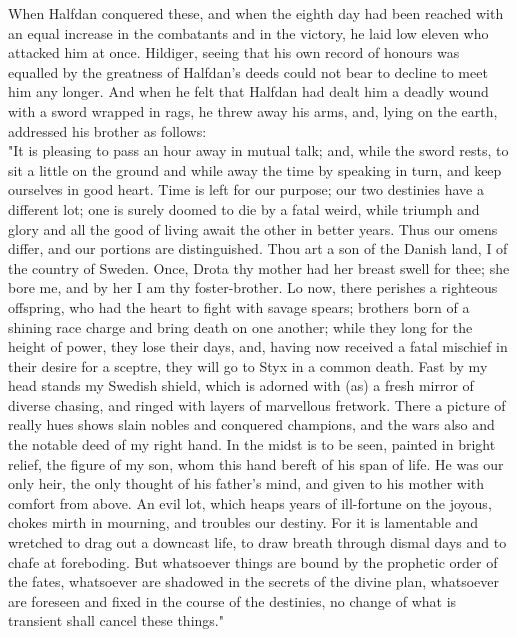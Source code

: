\documentclass[10pt,a4paper]{report}
\begin{document}
When Halfdan conquered these, and when the eighth day had been reached with an equal increase in the combatants and in the victory, he laid low eleven who attacked him at once. Hildiger, seeing that his own record of honours was equalled by the greatness of Halfdan's deeds could not bear to decline to meet him any longer. And when he felt that Halfdan had dealt him a deadly wound with a sword wrapped in rags, he threw away his arms, and, lying on the earth, addressed his brother as follows:\\

"It is pleasing to pass an hour away in mutual talk; and, while the sword rests, to sit a little on the ground and while away the time by speaking in turn, and keep ourselves in good heart. Time is left for our purpose; our two destinies have a different lot; one is surely doomed to die by a fatal weird, while triumph and glory and all the good of living await the other in better years. Thus our omens differ, and our portions are distinguished. Thou art a son of the Danish land, I of the country of Sweden. Once, Drota thy mother had her breast swell for thee; she bore me, and by her I am thy foster-brother. Lo now, there perishes a righteous offspring, who had the heart to fight with savage spears; brothers born of a shining race charge and bring death on one another; while they long for the height of power, they lose their days, and, having now received a fatal mischief in their desire for a sceptre, they will go to Styx in a common death. Fast by my head stands my Swedish shield, which is adorned with (as) a fresh mirror of diverse chasing, and ringed with layers of marvellous fretwork. There a picture of really hues shows slain nobles and conquered champions, and the wars also and the notable deed of my right hand. In the midst is to be seen, painted in bright relief, the figure of my son, whom this hand bereft of his span of life. He was our only heir, the only thought of his father's mind, and given to his mother with comfort from above. An evil lot, which heaps years of ill-fortune on the joyous, chokes mirth in mourning, and troubles our destiny. For it is lamentable and wretched to drag out a downcast life, to draw breath through dismal days and to chafe at foreboding. But whatsoever things are bound by the prophetic order of the fates, whatsoever are shadowed in the secrets of the divine plan, whatsoever are foreseen and fixed in the course of the destinies, no change of what is transient shall cancel these things."\\
\end{document}

